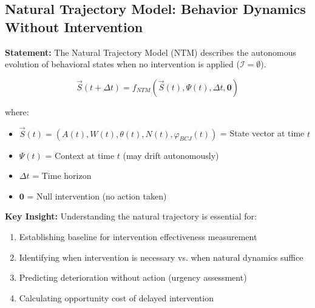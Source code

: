 \documentclass[11pt, a4paper]{article}
\begin{document}
\subsection{Natural Trajectory Model: Behavior Dynamics Without Intervention}
\label{sec:bc-ntm}

\begin{tcolorbox}[colback=red!5!white, colframe=red!75!black,
    title=\textbf{Definition NTM-D1: Natural Trajectory (Do-Nothing Baseline)}]

\textbf{Statement:} The Natural Trajectory Model (NTM) describes the autonomous evolution of behavioral states when no intervention is applied ($\mathcal{I} = \emptyset$).

\begin{equation}
\vec{S}(t+\Delta t) = f_{NTM}(\vec{S}(t), \Psi(t), \Delta t, \mathbf{0})
\label{eq:ntm-evolution}
\end{equation}

where:
\begin{itemize}[nosep]
\item $\vec{S}(t) = (A(t), W(t), \theta(t), N(t), \varphi_{BCJ}(t))$ = State vector at time $t$
\item $\Psi(t)$ = Context at time $t$ (may drift autonomously)
\item $\Delta t$ = Time horizon
\item $\mathbf{0}$ = Null intervention (no action taken)
\end{itemize}

\textbf{Key Insight:} Understanding the natural trajectory is essential for:
\begin{enumerate}[nosep]
\item Establishing baseline for intervention effectiveness measurement
\item Identifying when intervention is necessary vs. when natural dynamics suffice
\item Predicting deterioration without action (urgency assessment)
\item Calculating opportunity cost of delayed intervention
\end{enumerate}

\end{tcolorbox}
\end{document}
